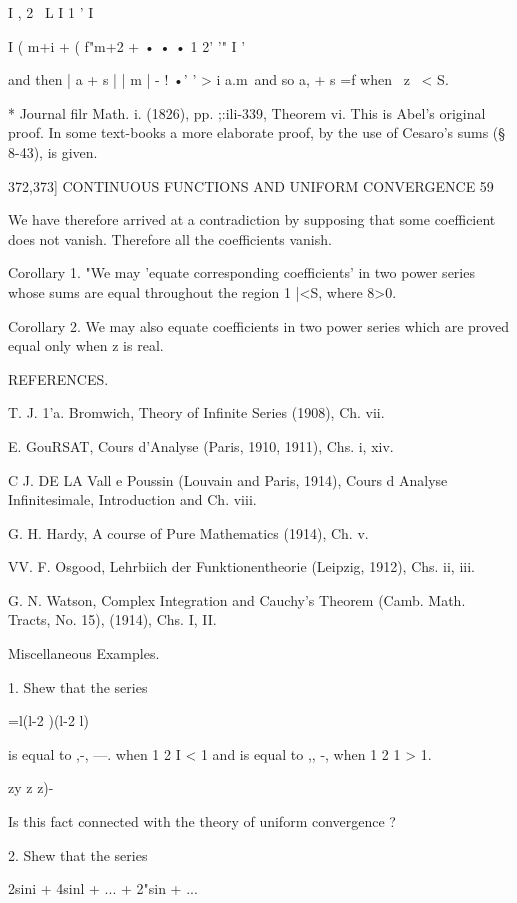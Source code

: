 I , 2 \ L I 1 ' I 

I ( m+i   + ( f"m+2  + • • • 1 2'  '" I ' 

and then | a  + s |   |  m | - ! •' ' >   i a.m\, and so   a,  + s =f when \ z \ < S. 

* Journal filr Math. i. (1826), pp. ;:ili-339, Theorem vi. This is Abel's original proof. In 
some text-books a more elaborate proof, by the use of Cesaro's sums (§ 8-43), is given. 



372,373] CONTINUOUS FUNCTIONS AND UNIFORM CONVERGENCE 59 

We have therefore arrived at a contradiction by supposing that some 
coefficient does not vanish. Therefore all the coefficients vanish. 

Corollary 1. "We may 'equate corresponding coefficients' in two power series whose 
sums are equal throughout the region 1  |<S, where 8>0. 

Corollary 2. We may also equate coefficients in two power series which are proved 
equal only when z is real. 



REFERENCES. 

T. J. 1'a. Bromwich, Theory of Infinite Series (1908), Ch. vii. 

E. GouRSAT, Cours d'Analyse (Paris, 1910, 1911), Chs. i, xiv. 

C J. DE LA Vall e Poussin (Louvain and Paris, 1914), Cours d  Analyse Infinitesimale, 
Introduction and Ch. viii. 

G. H. Hardy, A course of Pure Mathematics (1914), Ch. v. 

VV. F. Osgood, Lehrbiich der Funktionentheorie (Leipzig, 1912), Chs. ii, iii. 

G. N. Watson, Complex Integration and Cauchy's Theorem (Camb. Math. Tracts, 
No. 15), (1914), Chs. I, II. 



Miscellaneous Examples. 

1. Shew that the series 



 =l(l-2 )(l-2  l) 

is equal to ,-, —. when 1 2 I < 1 and is equal to ,, -, when 1 2 1 > 1. 

  zy   z  z)- 

Is this fact connected with the theory of uniform convergence ? 

2. Shew that the series 

2sini + 4sinl + ... + 2"sin  + ... 

